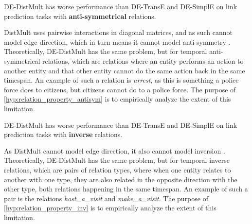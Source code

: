 
\begin{subhypothesis}
\label{hyp:relation_property_antisym}
DE-DistMult has worse performance than DE-TransE and DE-SimplE on link prediction tasks with \textbf{anti-symmetrical} relations.
\end{subhypothesis}

DistMult uses pairwise interactions in diagonal matrices, and as such cannot model edge direction, which in turn means it cannot model anti-symmetry \cite{goel19diachronicemb}. Theoretically, DE-DistMult has the same problem, but for temporal anti-symmetrical relations, which are relations where an entity performs an action to another entity and that other entity cannot do the same action back in the same timespan. An example of such a relation is \textit{arrest}, as this is something a police force does to citizens, but citizens cannot do to a police force. The purpose of \autoref{hyp:relation_property_antisym} is to empirically analyze the extent of this limitation.


\begin{subhypothesis}
\label{hyp:relation_property_inv}
DE-DistMult has worse performance than DE-TransE and DE-SimplE on link prediction tasks with \textbf{inverse} relations.
\end{subhypothesis}

As DistMult cannot model edge direction, it also cannot model inversion \cite{goel19diachronicemb}. Theoretically, DE-DistMult has the same problem, but for temporal inverse relations, which are pairs of relation types, where when one entity relates to another with one type, they are also related in the opposite direction with the other type, both relations happening in the same timespan. An example of such a pair is the relations \textit{host\_a\_visit} and \textit{make\_a\_visit}. The purpose of \autoref{hyp:relation_property_inv} is to empirically analyze the extent of this limitation.

